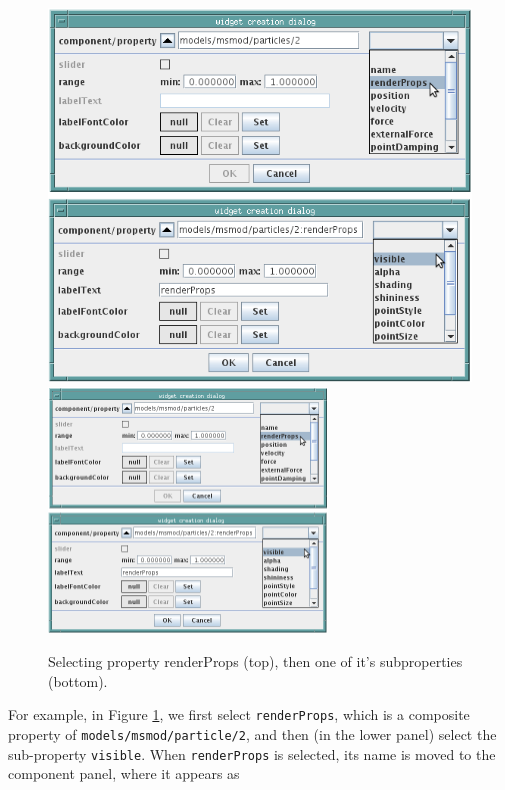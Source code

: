 \documentclass{article}
\begin{document}
\begin{figure}
\begin{center}
\iflatexml
\includegraphics[]{images/selectingRenderVisible}
\else
\includegraphics[width=0.66\textwidth]{images/selectingRenderVisible}
\fi
\end{center}
\caption{Selecting property renderProps (top), then one of it's 
subproperties (bottom).}%
\label{selectingRenderPropsFig}
\end{figure}

For example, in Figure \ref{selectingRenderPropsFig}, we first select
{\tt renderProps}, which is a composite property of
{\tt models/msmod/particle/2}, and then (in the lower panel) select the
sub-property {\tt visible}.  When {\tt renderProps} is selected, its name is
moved to the component panel, where it appears as
\end{document}
